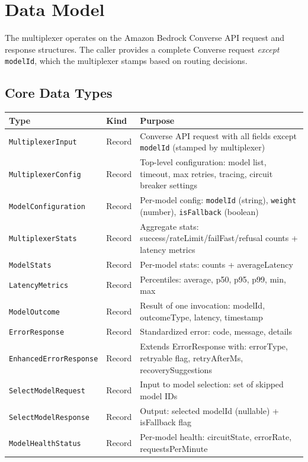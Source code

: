 \documentclass[10pt,letterpaper]{article}
\newcommand{\cls}[1]{\texttt{#1}}
\newcommand{\fld}[1]{\texttt{#1}}
\begin{document}
\section*{{\color{typepurple}Data Model}}

The multiplexer operates on the Amazon Bedrock Converse API request and response structures. The caller provides a complete Converse request \emph{except} \fld{modelId}, which the multiplexer stamps based on routing decisions.

\subsection*{{\color{typepurple}Core Data Types}}

\begin{tabular}{@{}l l p{7.5cm}@{}}
\toprule
\textbf{Type} & \textbf{Kind} & \textbf{Purpose} \\
\midrule
\cls{MultiplexerInput} & Record & Converse API request with all fields except \fld{modelId} (stamped by multiplexer) \\
\cls{MultiplexerConfig} & Record & Top-level configuration: model list, timeout, max retries, tracing, circuit breaker settings \\
\cls{ModelConfiguration} & Record & Per-model config: \fld{modelId} (string), \fld{weight} (number), \fld{isFallback} (boolean) \\
\cls{MultiplexerStats} & Record & Aggregate stats: success/rateLimit/failFast/refusal counts + latency metrics \\
\cls{ModelStats} & Record & Per-model stats: counts + averageLatency \\
\cls{LatencyMetrics} & Record & Percentiles: average, p50, p95, p99, min, max \\
\cls{ModelOutcome} & Record & Result of one invocation: modelId, outcomeType, latency, timestamp \\
\cls{ErrorResponse} & Record & Standardized error: code, message, details \\
\cls{EnhancedErrorResponse} & Record & Extends ErrorResponse with: errorType, retryable flag, retryAfterMs, recoverySuggestions \\
\cls{SelectModelRequest} & Record & Input to model selection: set of skipped model IDs \\
\cls{SelectModelResponse} & Record & Output: selected modelId (nullable) + isFallback flag \\
\cls{ModelHealthStatus} & Record & Per-model health: circuitState, errorRate, requestsPerMinute \\

\end{tabular}
\end{document}
